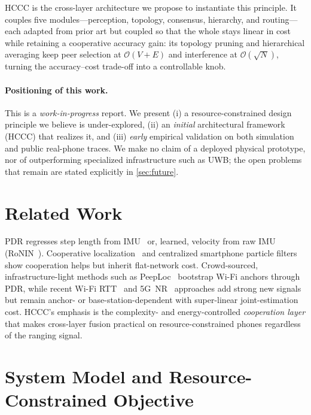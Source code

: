 \documentclass{ceurart}
\theoremstyle{definition}
\begin{document}
HCCC is the cross-layer architecture we propose to instantiate this principle. It
couples five modules---perception, topology, consensus, hierarchy, and
routing---each adapted from prior art but coupled so that the whole stays linear in
cost while retaining a cooperative accuracy gain: its topology pruning and
hierarchical averaging keep peer selection at $\mathcal{O}(V+E)$ and interference at
$\mathcal{O}(\sqrt N)$, turning the accuracy--cost trade-off into a controllable
knob.

\paragraph{Positioning of this work.}
This is a \emph{work-in-progress} report. We present (i) a resource-constrained
design principle we believe is under-explored, (ii) an \emph{initial} architectural
framework (HCCC) that realizes it, and (iii) \emph{early} empirical validation on
both simulation and public real-phone traces. We make no claim of a deployed physical
prototype, nor of outperforming specialized infrastructure such as UWB; the open
problems that remain are stated explicitly in \cref{sec:future}.

\section{Related Work}
\label{sec:related}

PDR regresses step length from IMU~\cite{jahn2010comparison} or, learned, velocity
from raw IMU (RoNIN~\cite{herath2020ronin}). Cooperative
localization~\cite{wymeersch2009cooperative} and centralized smartphone particle
filters~\cite{seco2018smartphone} show cooperation helps but inherit flat-network
cost. Crowd-sourced, infrastructure-light methods such as
PeepLoc~\cite{sie2025peep} bootstrap Wi-Fi anchors through PDR, while recent Wi-Fi
RTT~\cite{zhou2023wifi,mateysanz2025wifi} and 5G~NR~\cite{ye2025crowdsourced}
approaches add strong new signals but remain anchor- or base-station-dependent with
super-linear joint-estimation cost. HCCC's emphasis is the complexity- and
energy-controlled \emph{cooperation layer} that makes cross-layer fusion practical
on resource-constrained phones regardless of the ranging signal.

\section{System Model and Resource-Constrained Objective}
\label{sec:model}
\end{document}
